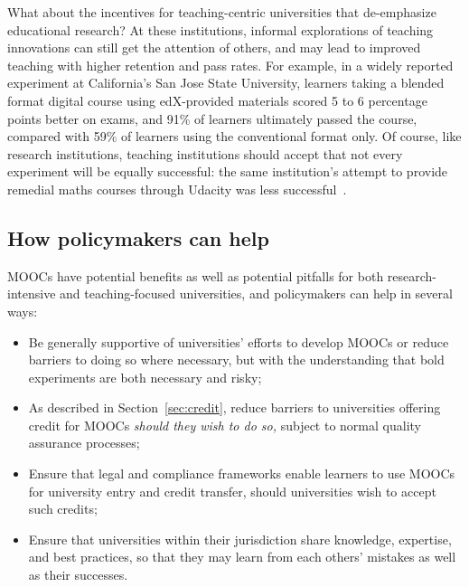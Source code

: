 What about the incentives for teaching-centric universities that
de-emphasize educational research?
At these institutions, informal explorations of teaching innovations
can still get the attention of others, and may lead to improved
teaching with higher retention and pass rates.  For example, in a widely
reported experiment at California's San Jose State University, learners
taking a blended format digital course using edX-provided materials
scored 5 to 6 percentage points better on exams, and 91\% of learners
ultimately passed the course, compared with 59\% of learners using the
conventional format only.  Of course, like research institutions,
teaching institutions should accept that not every experiment will be
equally successful: the same institution's attempt to provide remedial
maths courses through Udacity was less successful~\cite{cheal-sjsu-moocs}.

 
\subsection{How policymakers can help} 

MOOCs have potential benefits as
well as potential pitfalls for both research-intensive and
teaching-focused universities, and policymakers can help in several
ways:



\begin{itemize}

\item Be generally supportive of universities' efforts to develop MOOCs or reduce barriers to doing
  so where necessary, but with the understanding that bold experiments are both necessary and risky;

\item As described in Section~\ref{sec:credit}, reduce barriers to universities offering credit for
  MOOCs \emph{should they wish to do so,} subject to normal quality assurance processes;

\item Ensure that legal and compliance frameworks enable learners to use MOOCs for university entry
  and credit transfer, should universities wish to accept such credits;

\item Ensure that universities within their jurisdiction share knowledge, expertise, and best
  practices, so that they may learn from each others' mistakes as well as their successes.

\end{itemize}

